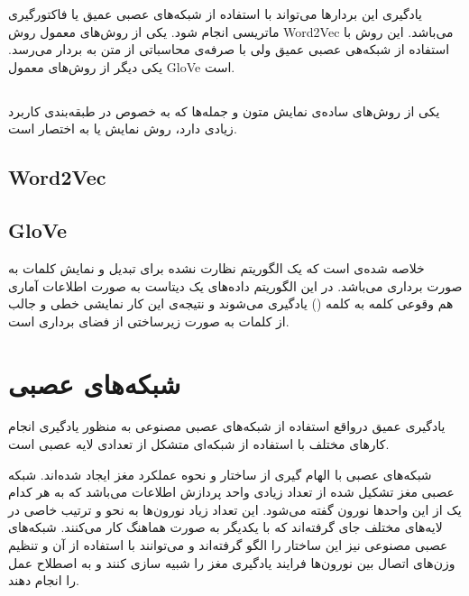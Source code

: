 \documentclass[12pt, a4paper, oneside]{report}
\begin{document}
یادگیری این بردار‌ها می‌تواند با استفاده از شبکه‌های عصبی عمیق یا فاکتورگیری ماتریسی انجام شود. یکی از روش‌های معمول روش‌
Word2Vec
می‌باشد. این روش با استفاده از شبکه‌هی عصبی عمیق ولی با صرفه‌ی محاسباتی از متن به بردار می‌رسد. یکی دیگر از روش‌های معمول
GloVe
است.
\cite{zhang2018deep}

\subsection{}

یکی از روش‌های ساده‌ی نمایش متون و جمله‌ها که به خصوص در طبقه‌بندی کاربرد زیادی دارد، روش نمایش
یا به اختصار
است.

\subsection{}

\subsection{Word2Vec}

\subsection{GloVe}

خلاصه شده‌ی 
است که یک الگوریتم نظارت نشده برای تبدیل و نمایش کلمات به صورت برداری می‌باشد.
در این الگوریتم داده‌های یک دیتاست به صورت اطلاعات آماری هم وقوعی کلمه به کلمه
()
یادگیری می‌شوند و نتیجه‌ی این کار نمایشی خطی و جالب از کلمات
به صورت زیرساختی از فضای برداری است\cite{8844895}.

\section{شبکه‌های عصبی}

یادگیری عمیق درواقع استفاده از شبکه‌های عصبی مصنوعی
به منظور یادگیری انجام کارهای مختلف
با استفاده از شبکه‌ای متشکل از تعدادی لایه عصبی است.

شبکه‌های عصبی با الهام گیری از ساختار و نحوه عملکرد مغز ایجاد شده‌اند. شبکه عصبی مغز تشکیل شده
از تعداد زیادی واحد پردازش اطلاعات می‌باشد که به هر کدام یک از این واحدها نورون گفته می‌شود.
این تعداد زیاد نورون‌ها به نحو و ترتیب خاصی در لایه‌های مختلف جای گرفته‌اند که با یکدیگر به صورت
هماهنگ کار می‌کنند. شبکه‌های عصبی مصنوعی نیز این ساختار را الگو گرفته‌اند و می‌توانند با استفاده از آن‌
و تنظیم وزن‌های اتصال بین نورون‌ها فرایند یادگیری مغز را شبیه سازی کنند و به اصطلاح عمل
را انجام دهند.
\end{document}
